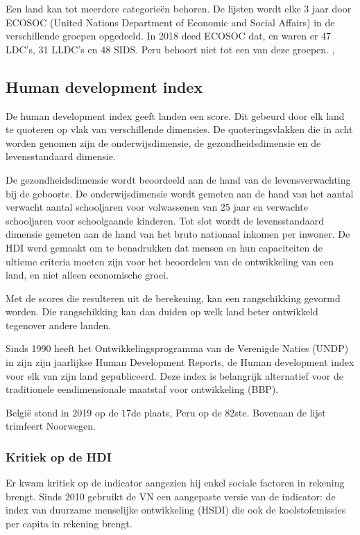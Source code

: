 Een land kan tot meerdere categorieën behoren. De lijsten wordt elke 3 jaar door ECOSOC (United Nations Department of Economic and Social Affairs) in de verschillende groepen opgedeeld. In 2018 deed ECOSOC dat, en waren er 47 LDC's, 31 LLDC's en 48 SIDS. Peru behoort niet tot een van deze groepen. \autocite{MarcJ.Bossuyt2005},

\subsection{Human development index}
De human development index geeft landen een score. Dit gebeurd door elk land te quoteren op vlak van verschillende dimensies. De quoteringsvlakken die in acht worden genomen zijn de onderwijsdimensie, de gezondheidsdimensie en de levensstandaard dimensie.

De gezondheidsdimensie wordt beoordeeld aan de hand van de levensverwachting bij de geboorte. De onderwijsdimensie wordt gemeten aan de hand van het aantal verwacht aantal schooljaren voor volwassenen van 25 jaar en verwachte schooljaren voor schoolgaande kinderen. Tot slot wordt de levensstandaard dimensie gemeten aan de hand van het bruto nationaal inkomen per inwoner. De HDI werd gemaakt om te benadrukken dat mensen en hun capaciteiten de ultieme criteria moeten zijn voor het beoordelen van de ontwikkeling van een land, en niet alleen economische groei. \autocite{UNDP2019}

Met de scores die resulteren uit de berekening, kan een rangschikking gevormd worden. Die rangschikking kan dan duiden op welk land beter ontwikkeld tegenover andere landen. 

Sinds 1990 heeft het Ontwikkelingsprogramma van de  Verenigde Naties (UNDP) in zijn zijn jaarlijkse Human Development Reports, de Human development index voor elk van zijn land gepubliceerd. \autocite{AmbujD.Sagar1997} Deze index is belangrijk alternatief voor de traditionele eendimensionale maatstaf voor ontwikkeling (BBP). 

België stond in 2019 op de 17de plaats, Peru op de 82ste. Bovenaan de lijst trimfeert Noorwegen. \autocite{UNDP2019a} 

\subsubsection{Kritiek op de HDI}
Er kwam kritiek op de indicator aangezien hij enkel sociale factoren in rekening brengt. Sinds 2010 gebruikt de VN een aangepaste versie van de indicator: de index van duurzame menselijke ontwikkeling (HSDI) die ook de koolstofemissies per capita in rekening brengt. \autocite{Economie2018}

